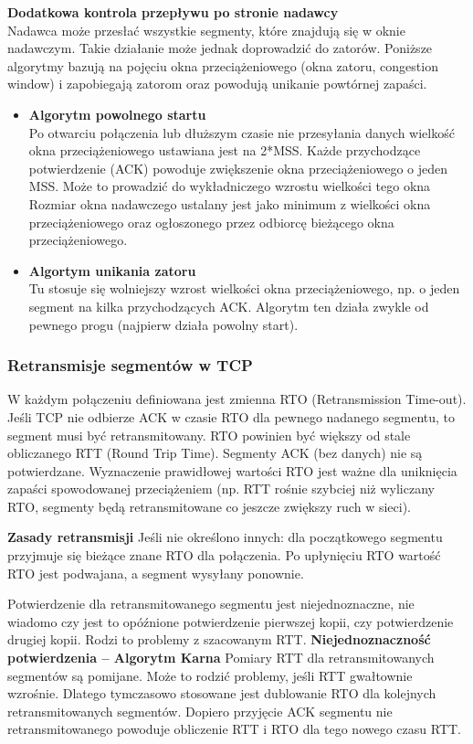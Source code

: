 \documentclass[a4paper]{article}
\begin{document}
\textbf{Dodatkowa kontrola przepływu po stronie nadawcy}\\
Nadawca może przesłać wszystkie segmenty, które znajdują się w oknie nadawczym. Takie działanie może jednak doprowadzić do zatorów. Poniższe algorytmy bazują na pojęciu okna przeciążeniowego (okna zatoru, congestion window) i zapobiegają zatorom oraz powodują unikanie powtórnej zapaści.
\begin{itemize}
    \item \textbf{Algorytm powolnego startu}\\
    Po otwarciu połączenia lub dłuższym czasie nie przesyłania danych wielkość okna
przeciążeniowego ustawiana jest na 2*MSS. Każde przychodzące potwierdzenie (ACK)
powoduje zwiększenie okna przeciążeniowego o jeden MSS. Może to prowadzić do wykładniczego wzrostu wielkości tego okna Rozmiar okna nadawczego ustalany jest jako minimum z wielkości okna przeciążeniowego
oraz ogłoszonego przez odbiorcę bieżącego okna przeciążeniowego.
    \item \textbf{Algortym unikania zatoru}\\
Tu stosuje się wolniejszy wzrost wielkości okna przeciążeniowego, np. o jeden
segment na kilka przychodzących ACK. Algorytm ten działa zwykle od pewnego progu (najpierw działa powolny start).
\end{itemize}


\subsubsection{Retransmisje segmentów w TCP}
W każdym połączeniu definiowana jest zmienna RTO (Retransmission Time-out). Jeśli TCP nie
odbierze ACK w czasie RTO dla pewnego nadanego segmentu, to segment musi być
retransmitowany. RTO powinien być większy od stale obliczanego RTT (Round Trip Time).
Segmenty ACK (bez danych) nie są potwierdzane.
Wyznaczenie prawidłowej wartości RTO jest ważne dla uniknięcia zapaści spowodowanej
przeciążeniem (np. RTT rośnie szybciej niż wyliczany RTO, segmenty będą retransmitowane
co jeszcze zwiększy ruch w sieci).

\textbf{Zasady retransmisji}
Jeśli nie określono innych: dla początkowego segmentu przyjmuje się bieżące znane RTO dla
połączenia. Po upłynięciu RTO wartość RTO jest podwajana, a segment wysyłany ponownie.

Potwierdzenie dla retransmitowanego segmentu jest niejednoznaczne, nie wiadomo czy jest
to opóźnione potwierdzenie pierwszej kopii, czy potwierdzenie drugiej kopii.
Rodzi to problemy z szacowanym RTT.
\textbf{Niejednoznaczność potwierdzenia – Algorytm Karna}
Pomiary RTT dla retransmitowanych segmentów są pomijane. Może to rodzić problemy, jeśli
RTT gwałtownie wzrośnie. Dlatego tymczasowo stosowane jest dublowanie RTO dla
kolejnych retransmitowanych segmentów. Dopiero przyjęcie ACK segmentu nie
retransmitowanego powoduje obliczenie RTT i RTO dla tego nowego czasu RTT.
\end{document}
